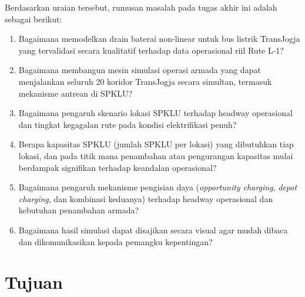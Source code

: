Berdasarkan uraian tersebut, rumusan masalah pada tugas akhir ini adalah
sebagai berikut:
\begin{enumerate}
	\item Bagaimana memodelkan drain baterai non-linear untuk bus listrik
	TransJogja yang tervalidasi secara kualitatif terhadap data operasional
	riil Rute L-1?
	\item Bagaimana membangun mesin simulasi operasi armada yang dapat
	menjalankan seluruh 20 koridor TransJogja secara simultan, termasuk
	mekanisme antrean di SPKLU?
	\item Bagaimana pengaruh skenario lokasi SPKLU terhadap headway operasional
	dan tingkat kegagalan rute pada kondisi elektrifikasi penuh?
	\item Berapa kapasitas SPKLU (jumlah SPKLU per lokasi) yang dibutuhkan tiap
	lokasi, dan pada titik mana penambahan atau pengurangan kapasitas mulai
	berdampak signifikan terhadap keandalan operasional?
	\item Bagaimana pengaruh mekanisme pengisian daya (\textit{opportunity
		charging}, \textit{depot charging}, dan kombinasi keduanya) terhadap
	headway operasional dan kebutuhan penambahan armada?
	\item Bagaimana hasil simulasi dapat disajikan secara visual agar mudah
	dibaca dan dikomunikasikan kepada pemangku kepentingan?
\end{enumerate}

\section{Tujuan}


